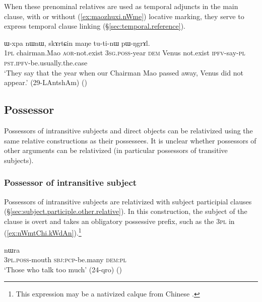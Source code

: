 When these prenominal relatives are used as temporal adjuncts in the main clause, with or without (\ref{ex:maozhuxi.nWme}) locative marking, they serve to express temporal clause linking (§\ref{sec:temporal.reference}).

\begin{exe}
\ex \label{ex:maozhuxi.nWme}
 ɯ-xpa nɯnɯ, skɤrtɕin maŋe tu-ti-nɯ pɯ-ŋgrɤl. \\
\textsc{1pl} chairman.Mao \textsc{aor}-not.exist \textsc{3sg}.\textsc{poss}-year \textsc{dem} Venus not.exist \textsc{ipfv}-say-\textsc{pl} \textsc{pst}.\textsc{ipfv}-be.usually.the.case \\
\glt `They say that the year when our Chairman Mao passed away, Venus did not appear.' (29-LAntshAm)
()
\end{exe}
 

\subsection{Possessor} \label{sec:possessor.relativization}
Possessors of intransitive subjects and direct objects can be relativized using the same relative constructions as their possessees. It is unclear whether possessors of other arguments can be relativized (in particular possessors of transitive subjects).

\subsubsection{Possessor of intransitive subject}  \label{sec:S.possessor.relativization}
Possessors of intransitive subjects are relativized with subject participial clauses (§\ref{sec:subject.participle.other.relative}). In this construction, the subject of the clause is overt and takes an obligatory possessive prefix, such as the \textsc{3pl}  in (\ref{ex:nWmtChi.kWdAn}).\footnote{This expression may be a nativized calque from Chinese . }

\begin{exe}
\ex \label{ex:nWmtChi.kWdAn}
 nɯra \\
\textsc{3pl}.\textsc{poss}-mouth \textsc{sbj}:\textsc{pcp}-be.many \textsc{dem}:\textsc{pl} \\
\glt `Those who talk too much' (24-qro)
()
\end{exe}

